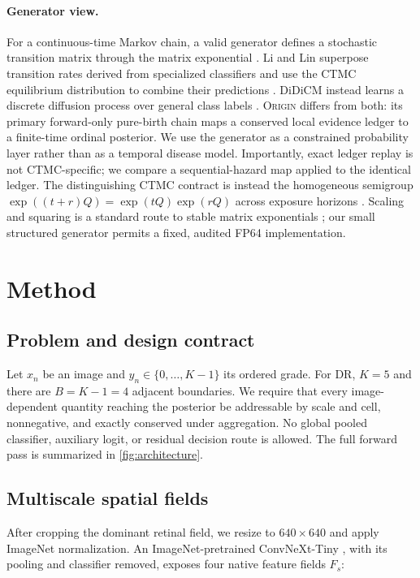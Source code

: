 \documentclass[10pt,twocolumn,letterpaper]{article}
\newcommand{\method}{\textsc{Origin}\xspace}
\begin{document}
\paragraph{Generator view.}
For a continuous-time Markov chain, a valid generator defines a stochastic
transition matrix through the matrix exponential \cite{le2022ctmc}.  Li and
Lin superpose transition rates derived from specialized classifiers and use
the CTMC equilibrium distribution to combine their predictions
\cite{li2017ctmc}.  DiDiCM instead learns a discrete diffusion process over
general class labels \cite{belhasin2026didicm}.  \method differs from both: its
primary forward-only pure-birth chain maps a conserved local evidence ledger to
a finite-time ordinal posterior.  We use the generator as a constrained
probability layer rather than as a temporal disease model.  Importantly, exact
ledger replay is not CTMC-specific; we compare a sequential-hazard map applied
to the identical ledger.  The distinguishing CTMC contract is instead the
homogeneous semigroup $\exp((t+r)Q)=\exp(tQ)\exp(rQ)$ across exposure horizons
\cite{le2022ctmc}.  Scaling and squaring is a standard route to stable matrix
exponentials \cite{higham2005scaling}; our small structured generator permits a
fixed, audited FP64 implementation.

\section{Method}
\label{sec:method}

\subsection{Problem and design contract}

Let $x_n$ be an image and $y_n\in\{0,\ldots,K-1\}$ its ordered grade.  For DR,
$K=5$ and there are $B=K-1=4$ adjacent boundaries.  We require that every
image-dependent quantity reaching the posterior be addressable by scale and
cell, nonnegative, and exactly conserved under aggregation.  No global pooled
classifier, auxiliary logit, or residual decision route is allowed.  The full
forward pass is summarized in \cref{fig:architecture}.

\subsection{Multiscale spatial fields}

After cropping the dominant retinal field, we resize to $640\!\times\!640$ and
apply ImageNet normalization.  An ImageNet-pretrained ConvNeXt-Tiny
\cite{liu2022convnext}, with its pooling and classifier removed, exposes four
native feature fields $F_s$:
\end{document}
